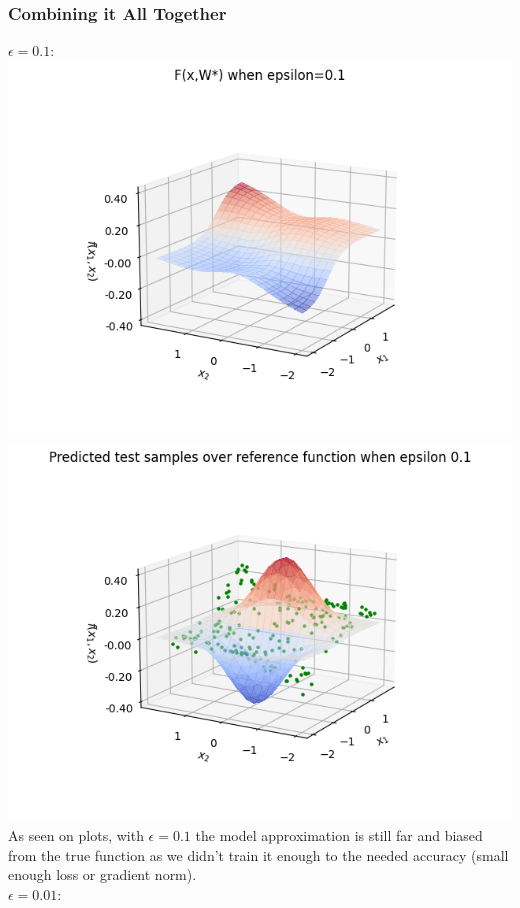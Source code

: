 \documentclass[12pt]{article}
\begin{document}
\subsubsection{ Combining it All Together}
$\epsilon=0.1$:\\
\includegraphics{model_approx_epsilon_0.png}\\
\includegraphics{model_test_over_ref_func_0.png}\\
As seen on plots, with $\epsilon=0.1$ the model approximation is still far and biased from the true function as we didn't train it enough to the needed accuracy (small enough loss or gradient norm).\\
\newpage
$\epsilon=0.01$:\\
\end{document}
